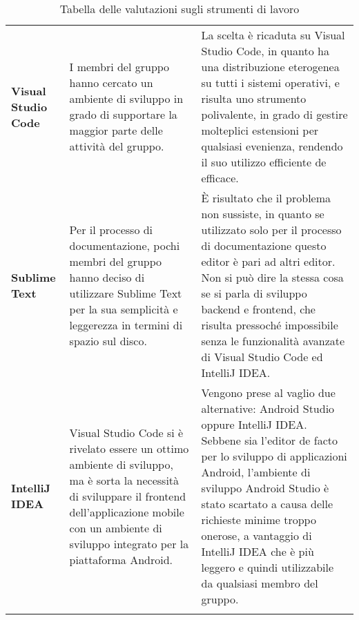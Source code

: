 \documentclass[../piano-di-qualifica.tex]{subfiles}
\begin{document}
\begin{longtable}[H]{>{\centering\bfseries}m{3cm} >{\centering\arraybackslash}m{6.5cm} >{\centering\arraybackslash}m{6.8cm}}
  Visual Studio Code                & I membri del gruppo hanno cercato un ambiente di sviluppo in grado di supportare la maggior parte delle attività del gruppo.                                                                                                                                     & La scelta è ricaduta su Visual Studio Code, in quanto ha una distribuzione eterogenea su tutti i sistemi operativi, e risulta uno strumento polivalente, in grado di gestire molteplici estensioni per qualsiasi evenienza, rendendo il suo utilizzo efficiente de efficace.                                                                                      \\
  Sublime Text                      & Per il processo di documentazione, pochi membri del gruppo hanno deciso di utilizzare Sublime Text per la sua semplicità e leggerezza in termini di spazio sul disco.                                                                                            & È risultato che il problema non sussiste, in quanto se utilizzato solo per il processo di documentazione questo editor è pari ad altri editor. Non si può dire la stessa cosa se si parla di sviluppo backend e frontend, che risulta pressoché impossibile senza le funzionalità avanzate di Visual Studio Code ed IntelliJ IDEA\@.                             \\
  IntelliJ IDEA                     & Visual Studio Code si è rivelato essere un ottimo ambiente di sviluppo, ma è sorta la necessità di sviluppare il frontend dell'applicazione mobile con un ambiente di sviluppo integrato per la piattaforma Android.                                             & Vengono prese al vaglio due alternative: Android Studio oppure IntelliJ IDEA\@. Sebbene sia l'editor de facto per lo sviluppo di applicazioni Android, l'ambiente di sviluppo Android Studio è stato scartato a causa delle richieste minime troppo onerose, a vantaggio di IntelliJ IDEA che è più leggero e quindi utilizzabile da qualsiasi membro del gruppo. \\
  \rowcolor{white}
  \caption{Tabella delle valutazioni sugli strumenti di lavoro}%
  \label{tab:tabella_valutazioni_strumenti}
\end{longtable}
\end{document}
